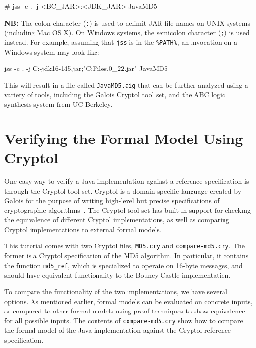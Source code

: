 \documentclass[11pt]{article}
\begin{document}
\begin{code}
# jss -c . -j <BC_JAR>:<JDK_JAR> JavaMD5
\end{code}

{\bf NB:} The colon character (\texttt{:}) is used to delimit JAR file
names on UNIX systems (including Mac OS X).  On Windows systems, the
semicolon character (\texttt{;}) is used instead.  For example, assuming
that \texttt{jss} is in the \texttt{\%PATH\%}, an invocation on a
Windows system may look like:

\begin{scriptsize}
\begin{code}
jss -c . -j C:\myjars\bcprov-jdk16-145.jar;"C:\Program Files\Java{}.0_22\jre\lib\rt.jar" JavaMD5
\end{code}
\end{scriptsize}


This will result in a file called \texttt{JavaMD5.aig} that can be
further analyzed using a variety of tools, including the Galois
Cryptol tool set, and the ABC logic synthesis system from UC
Berkeley.

\section{Verifying the Formal Model Using Cryptol}

One easy way to verify a Java implementation against a reference
specification is through the Cryptol tool set. Cryptol is a
domain-specific language created by Galois for the purpose of writing
high-level but precise specifications of cryptographic
algorithms~\cite{cryptol}. The Cryptol tool set has built-in support
for checking the equivalence of different Cryptol implementations, as
well as comparing Cryptol implementations to external formal models.

This tutorial comes with two Cryptol files, \texttt{MD5.cry} and
\texttt{compare-md5.cry}. The former is a Cryptol specification of the
MD5 algorithm. In particular, it contains the function
\texttt{md5\_ref}, which is specialized to operate on 16-byte
messages, and should have equivalent functionality to the Bouncy
Castle implementation.

To compare the functionality of the two implementations, we have
several options. As mentioned earlier, formal models can be evaluated
on concrete inputs, or compared to other formal models using proof
techniques to show equivalence for all possible inputs. The contents
of \texttt{compare-md5.cry} show how to compare the formal model of
the Java implementation against the Cryptol reference specification.
\end{document}
